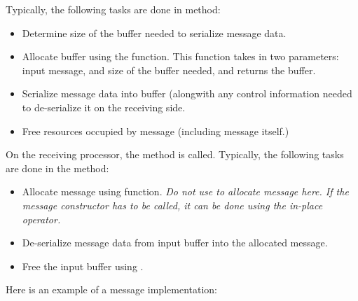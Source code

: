 Typically, the following tasks are done in  method:

\begin{itemize}

\item Determine size of the buffer needed to serialize message data.

\item Allocate buffer using the  function. This function
takes in two parameters: input message, and size of the buffer needed, and
returns the buffer.

\item Serialize message data into buffer (alongwith any control information
needed to de-serialize it on the receiving side.

\item Free resources occupied by message (including message itself.)  

\end{itemize}

On the receiving processor, the  method is called. Typically, the
following tasks are done in the  method:

\begin{itemize}

\item Allocate message using  function. {\em Do not
use  to allocate message here. If the message constructor has
to be called, it can be done using the in-place  operator.}

\item De-serialize message data from input buffer into the allocated message.

\item Free the input buffer using .

\end{itemize}

Here is an example of a  message implementation:

